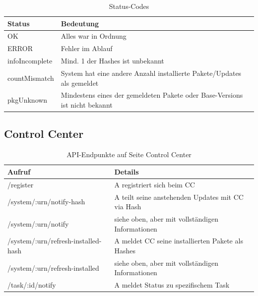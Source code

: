 \begin{table}[H]
    \centering
    \caption{Status-Codes}
    \label{api:codes}
    \begin{tabular}{ll}
        \hline
        \textbf{Status} & \textbf{Bedeutung}                                                          \\ \hline
        OK              & Alles war in Ordnung                                                        \\
        ERROR           & Fehler im Ablauf                                                            \\
        infoIncomplete  & Mind. 1 der Hashes ist unbekannt                                            \\
        countMismatch   & System hat eine andere Anzahl installierte Pakete/Updates als gemeldet      \\
        pkgUnknown      & Mindestens eines der gemeldeten Pakete oder Base-Versions ist nicht bekannt \\ \hline
    \end{tabular}
\end{table}


\subsection{Control Center}

\begin{table}[H]
    \centering
    \caption{API-Endpunkte auf Seite Control Center}
    \label{api:endpoints_cc}
    \begin{tabular}{ll}
        \hline
        \textbf{Aufruf}                     & \textbf{Details}                                  \\ \hline
        /register                           & A registriert sich beim CC                        \\
        /system/:urn/notify-hash            & A teilt seine anstehenden Updates mit CC via Hash \\
        /system/:urn/notify                 & siehe oben, aber mit vollständigen Informationen  \\
        /system/:urn/refresh-installed-hash & A meldet CC seine installierten Pakete als Hashes \\
        /system/:urn/refresh-installed      & siehe oben, aber mit vollständigen Informationen  \\
        /task/:id/notify                    & A meldet Status zu spezifischem Task              \\ \hline
    \end{tabular}
\end{table}

